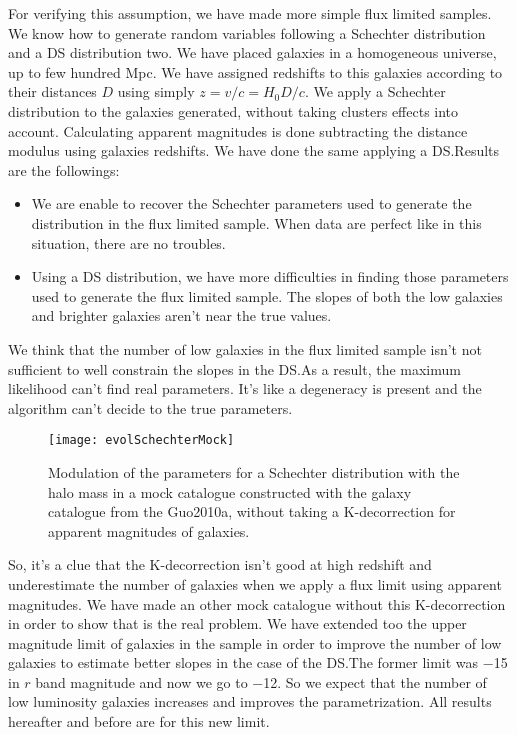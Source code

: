 For verifying this assumption, we have made more simple flux limited samples. We know how to generate random variables following a
Schechter distribution and a DS distribution two. We have placed galaxies in a homogeneous universe, up to few hundred Mpc. We have
assigned redshifts to this galaxies according to their distances $D$ using simply $z=v/c={H_0}{D}/c$. We apply a Schechter
distribution to the galaxies generated, without taking clusters effects into account. Calculating apparent magnitudes is done
subtracting the distance modulus using galaxies redshifts. We have done the same applying a DS.\@ Results are the followings:
\begin{itemize}
    \item We are enable to recover the Schechter parameters used to generate the distribution in the flux limited sample. When
    data are perfect like in this situation, there are no troubles.
    \item Using a DS distribution, we have more difficulties in finding those parameters used to generate the flux limited
    sample. The slopes of both the low galaxies and brighter galaxies aren't near the true values.
\end{itemize}
We think that the number of low galaxies in the flux limited sample isn't not sufficient to well constrain the slopes in the DS.\@ As
a result, the maximum likelihood can't find real parameters. It's like a degeneracy is present and the algorithm can't decide to the
true parameters.
\begin{figure}[htb]
    \centering
    \texttt{[image: evolSchechterMock]}
    \caption{\footnotesize{}Modulation of the parameters for a Schechter distribution with the halo mass in a mock catalogue
    constructed with the galaxy catalogue from the Guo2010a, without taking a K-decorrection for apparent magnitudes of
    galaxies.}
\label{fig:parammock}
\end{figure}

So, it's a clue that the K-decorrection isn't good at high redshift and underestimate the number of galaxies when we apply a flux
limit using apparent magnitudes. We have made an other mock catalogue without this K-decorrection in order to show that is the real
problem. We have extended too the upper magnitude limit of galaxies in the sample in order to improve the number of low galaxies to
estimate better slopes in the case of the DS.\@ The former limit was \num{-15} in $r$ band magnitude and now we go to \num{-12}. So we
expect that the number of low luminosity galaxies increases and improves the parametrization. All results hereafter and before are
for this new limit.

